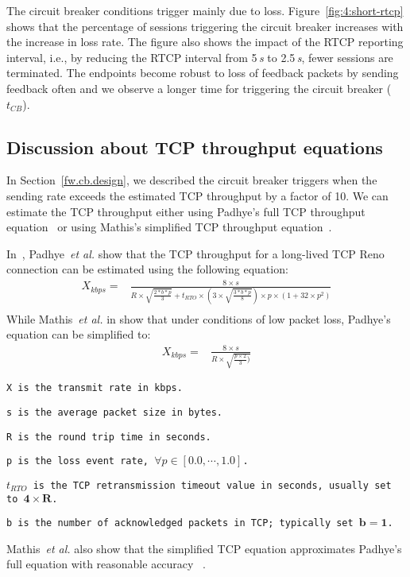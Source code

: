 The circuit breaker conditions trigger mainly due to loss. Figure~\ref{fig:4:short-rtcp}
shows that the percentage of sessions triggering the circuit breaker
increases with the increase in loss rate. The figure also shows the impact of
the RTCP reporting interval, i.e., by reducing the RTCP interval from 5\,\emph{s} to
2.5\,\emph{s}, fewer sessions are terminated. The endpoints become robust to loss of
feedback packets by sending feedback often and we observe a longer time for
triggering the circuit breaker ($t_{CB}$).

\subsection{Discussion about TCP throughput equations}

In Section~\ref{fw.cb.design}, we described the circuit breaker triggers when
the sending rate exceeds the estimated TCP throughput by a factor of 10. We
can estimate the TCP throughput either using Padhye's full TCP throughput
equation~\cite{padhye1998modeling} or using Mathis's simplified TCP throughput
equation~\cite{mathis1997macroscopic}.

In~\cite{padhye1998modeling}, Padhye~\emph{et al.} show that the TCP
throughput for a long-lived TCP Reno connection can be estimated using the
following equation:
\begin{align*}
X_{kbps} = &\frac{8 \times s}{R \times \sqrt{\frac{2*b*p}{3}}+t_{RTO} \times (3 \times \sqrt{\frac{3*b*p}{8}})\times p \times (1+32 \times p^2)}\\
\end{align*}
While Mathis~\emph{et al.} in \cite{mathis1997macroscopic} show that under
conditions of low packet loss, Padhye's equation can be simplified to:
\begin{align*}
    X_{kbps} = & \frac{8 \times s}{R \times \sqrt{\frac{p \times 2}{3})}}
\end{align*}
\begin{itemize}
\setlength{\itemsep}{0pt}
{\footnotesize
\item[] \texttt{X is the transmit rate in kbps.}
\item[] \texttt{s is the average packet size in bytes.}
\item[] \texttt{R is the round trip time in seconds. }
\item[] \texttt{p is the loss event rate, $\forall p \in [0.0, \cdots ,1.0]$.}
\item[] \texttt{$t_{RTO}$ is the TCP retransmission timeout value in seconds, usually set to $\mathbf{4 \times R}$.}
\item[] \texttt{b is the number of acknowledged packets in TCP; typically set $\mathbf{b=1}$.}
}
\end{itemize}
Mathis~\emph{et al.} also show that the simplified TCP equation approximates
Padhye's full equation with reasonable accuracy~\cite{mathis1997macroscopic} .


